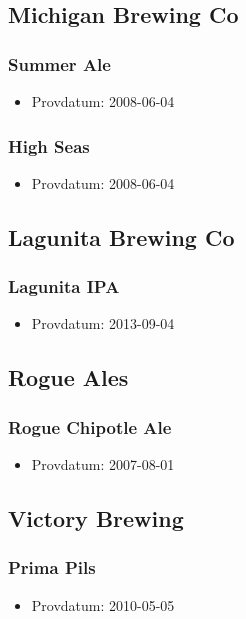 \documentclass[11pt]{article}
\begin{document}
\subsection{Michigan Brewing Co}
\label{sec:orgbe14581}
\subsubsection{Summer Ale}
\label{sec:orgf35d81e}
\begin{itemize}
\item Provdatum: 2008-06-04
\end{itemize}
\subsubsection{High Seas}
\label{sec:org51ed5d4}
\begin{itemize}
\item Provdatum: 2008-06-04
\end{itemize}
\subsection{Lagunita Brewing Co}
\label{sec:orgd599996}
\subsubsection{Lagunita IPA}
\label{sec:org788c965}
\begin{itemize}
\item Provdatum: 2013-09-04
\end{itemize}
\subsection{Rogue Ales}
\label{sec:org67b6fcd}
\subsubsection{Rogue Chipotle Ale}
\label{sec:orgf39918c}
\begin{itemize}
\item Provdatum: 2007-08-01
\end{itemize}
\subsection{Victory Brewing}
\label{sec:org6d23a5a}
\subsubsection{Prima Pils}
\label{sec:orga1188eb}
\begin{itemize}
\item Provdatum: 2010-05-05
\end{itemize}
\end{document}
